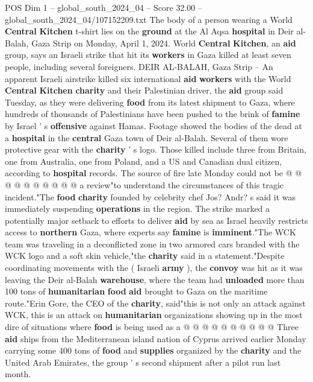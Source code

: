 \begin{textsample}{POS Dim 1 – global\_south\_2024\_04 – Score 32.00 – global\_south\_2024\_04/107152209.txt}  \label{ex:f1_pos_145}
The body of a person wearing a World \textbf{Central} \textbf{Kitchen} t-shirt lies on the \textbf{ground} at the Al Aqsa \textbf{hospital} in Deir al-Balah, Gaza Strip on Monday, April 1, 2024.
World \textbf{Central} \textbf{Kitchen}, an \textbf{aid} group, says an Israeli strike that hit its \textbf{workers} in Gaza killed at least seven people, including several foreigners.
DEIR AL-BALAH, Gaza Strip -- An apparent Israeli airstrike killed six international \textbf{aid} \textbf{workers} with the World \textbf{Central} \textbf{Kitchen} \textbf{charity} and their Palestinian driver, the \textbf{aid} group said Tuesday, as they were delivering \textbf{food} from its latest shipment to Gaza, where hundreds of thousands of Palestinians have been pushed to the brink of \textbf{famine} by Israel ' s \textbf{offensive} against Hamas.
Footage showed the bodies of the dead at a \textbf{hospital} in the \textbf{central} Gaza town of Deir al-Balah.
Several of them wore protective gear with the \textbf{charity} ' s logo.
Those killed include three from Britain, one from Australia, one from Poland, and a US and Canadian dual citizen, according to \textbf{hospital} records.
The source of fire late Monday could not be @ @ @ @ @ @ @ @ @ @ a review"to understand the circumstances of this tragic incident."The \textbf{food} \textbf{charity} founded by celebrity chef Jos?
Andr? s said it was immediately suspending \textbf{operations} in the region.
The strike marked a potentially major setback to efforts to deliver \textbf{aid} by sea as Israel heavily restricts access to \textbf{northern} Gaza, where experts say \textbf{famine} is \textbf{imminent}."The WCK team was traveling in a deconflicted zone in two armored cars branded with the WCK logo and a soft skin vehicle,"the \textbf{charity} said in a statement."Despite coordinating movements with the ( Israeli \textbf{army} ), the \textbf{convoy} was hit as it was leaving the Deir al-Balah \textbf{warehouse}, where the team had \textbf{unloaded} more than 100 tons of \textbf{humanitarian} \textbf{food} \textbf{aid} brought to Gaza on the maritime route."Erin Gore, the CEO of the \textbf{charity}, said"this is not only an attack against WCK, this is an attack on \textbf{humanitarian} organizations showing up in the most dire of situations where \textbf{food} is being used as a @ @ @ @ @ @ @ @ @ @ Three \textbf{aid} ships from the Mediterranean island nation of Cyprus arrived earlier Monday carrying some 400 tons of \textbf{food} and \textbf{supplies} organized by the \textbf{charity} and the United Arab Emirates, the group ' s second shipment after a pilot run last month.

\end{textsample}
